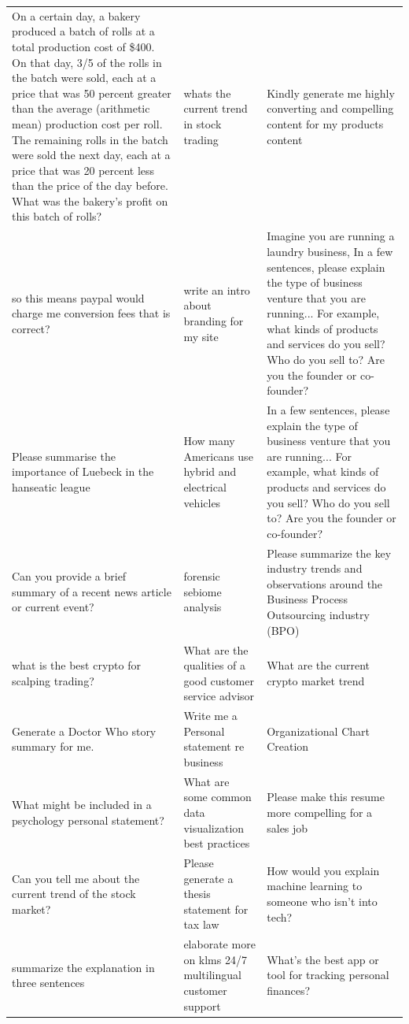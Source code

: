 \begin{table}[ht]
\begin{tabular}{p{4.3cm}p{4.3cm}p{4.3cm}}
On a certain day, a bakery produced a batch of rolls at a total production cost of \$400. On that day, 3/5 of the rolls in the batch were sold, each at a price that was 50 percent greater than the average (arithmetic mean) production cost per roll. The remaining rolls in the batch were sold the next day, each at a price that was 20 percent less than the price of the day before. What was the bakery’s profit on this batch of rolls? & whats the current trend in  stock trading & Kindly generate me highly converting and compelling content for my products content \\[4pt]
so this means paypal would charge me conversion fees that is correct? & write an intro about branding for my site & Imagine you are running a laundry business, In a few sentences, please explain the type of business venture that you are running...   For example, what kinds of products and services do you sell? Who do you sell to? Are you the founder or co-founder? \\[4pt]
Please summarise the importance of Luebeck in the hanseatic league & How many Americans use hybrid and electrical vehicles & In a few sentences, please explain the type of business venture that you are running...  For example, what kinds of products and services do you sell? Who do you sell to? Are you the founder or co-founder? \\[4pt]
Can you provide a brief summary of a recent news article or current event? & forensic sebiome analysis & Please summarize the key industry trends and observations around the Business Process Outsourcing industry (BPO) \\[4pt]
what is the best crypto for scalping trading? & What are the qualities of a good customer service advisor & What are the current crypto market trend \\[4pt]
Generate a Doctor Who story summary for me. & Write me a Personal statement re business & Organizational Chart Creation \\[4pt]
What might be included in a psychology personal statement? & What are some common data visualization best practices & Please make this resume more compelling for a sales job \\[4pt]
Can you tell me about the current trend of the stock market? & Please generate a thesis statement for tax law & How would you explain machine learning to someone who isn’t into tech? \\[4pt]
summarize the explanation in three sentences & elaborate more on klms 24/7 multilingual customer support & What’s the best app or tool for tracking personal finances? \\[4pt]

\end{tabular}
\end{table}
